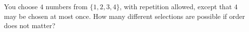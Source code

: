 You choose $4$ numbers from $\{1,2,3,4\}$, with repetition allowed, except that $4$ may be chosen at most once. How many different selections are possible if order does not matter?
